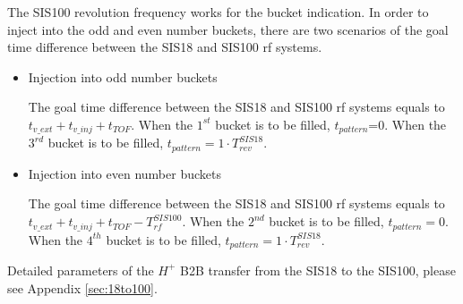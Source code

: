The SIS100 revolution frequency works for the bucket indication. In order to inject into the odd and even number buckets, there are two scenarios of the goal time difference between the SIS18 and SIS100 rf systems.
\begin{itemize}
	\item Injection into odd number buckets
		
		The goal time difference between the SIS18 and SIS100 rf systems equals to $t_{v\_ext}+t_{v\_inj}+t_{TOF}$. When the $1^{st}$ bucket is to be filled, $t_{pattern}$=0. When the $3^{rd}$ bucket is to be filled, $t_{pattern}=1 \cdot T_{\mathit{rev}}^{\mathit{SIS18}}$. 
	\item Injection into even number buckets
	
		The goal time difference between the SIS18 and SIS100 rf systems equals to $t_{v\_ext}+t_{v\_inj}+t_{TOF}-T_{\mathit{rf}}^{\mathit{SIS100}}$. When the $2^{nd}$ bucket is to be filled, $t_{pattern}=0$. When the $4^{th}$ bucket is to be filled, $t_{pattern}=1\cdot T_{\mathit{rev}}^{\mathit{SIS18}}$. 

\end{itemize}

Detailed parameters of the $H^{+}$ B2B transfer from the SIS18 to the SIS100, please see Appendix \ref{sec:18to100}.

